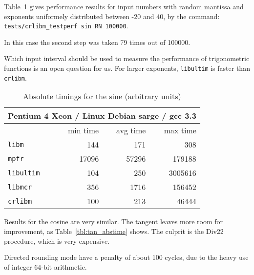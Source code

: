 Table~\ref{tbl:sine_abstime} gives performance results for input numbers with random
mantissa and exponents uniformely distributed between -20 and 40, by the command:\\
\verb!tests/crlibm_testperf sin RN 100000!.

In this case the second step was taken 79 times out of 100000.

Which input interval should be used to measure the performance of
trigonometric functions is an open question for us. For larger exponents, \texttt{libultim}
is faster than \texttt{crlibm}.

\begin{table}[!htb]
\begin{center}
\renewcommand{\arraystretch}{1.2}
\begin{tabular}{|l|r|r|r|}
\hline
 \multicolumn{4}{|c|}{Pentium 4 Xeon / Linux Debian sarge / gcc 3.3}   \\ 
 \hline
                        & min time       & avg time     & max time        \\ 
 \hline
 \texttt{libm}          & 144           &        171    & 308      \\ 
 \hline
 \texttt{mpfr}          & 17096         &      57296    & 179188      \\ 
 \hline
 \texttt{libultim}      & 104           &        250    & 3005616      \\ 
 \hline
 \texttt{libmcr}        & 356           &       1716    & 156452      \\ 
 \hline
\texttt{crlibm}         & 100           &        213    & 46444      \\ 
 \hline
\end{tabular}
\end{center}
\caption{Absolute timings for the sine (arbitrary units)
  \label{tbl:sine_abstime}}
\end{table}

Results for the cosine are very similar. The tangent leaves more room
for improvement, as Table~\ref{tbl:tan_abstime} shows. The culprit is
the Div22 procedure, which is very expensive. 

Directed rounding mode have a penalty of about 100 cycles, due to the
heavy use of integer 64-bit arithmetic.

